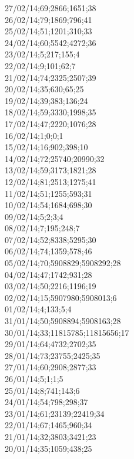 27/02/14;69;2866;1651;38 \\
26/02/14;79;1869;796;41 \\
25/02/14;51;1201;310;33 \\
24/02/14;60;5542;4272;36 \\
23/02/14;5;217;155;4 \\
22/02/14;9;101;62;7 \\
21/02/14;74;2325;2507;39 \\
20/02/14;35;630;65;25 \\
19/02/14;39;383;136;24 \\
18/02/14;59;3330;1998;35 \\
17/02/14;47;2220;1076;28 \\
16/02/14;1;0;0;1 \\
15/02/14;16;902;398;10 \\
14/02/14;72;25740;20990;32 \\
13/02/14;59;3173;1821;28 \\
12/02/14;81;2513;1275;41 \\
11/02/14;51;1255;593;31 \\
10/02/14;54;1684;698;30 \\
09/02/14;5;2;3;4 \\
08/02/14;7;195;248;7 \\
07/02/14;52;8338;5295;30 \\
06/02/14;74;1359;578;46 \\
05/02/14;70;5908829;5908292;28 \\
04/02/14;47;1742;931;28 \\
03/02/14;50;2216;1196;19 \\
02/02/14;15;5907980;5908013;6 \\
01/02/14;4;133;5;4 \\
31/01/14;50;5908894;5908163;28 \\
30/01/14;33;11815785;11815656;17 \\
29/01/14;64;4732;2702;35 \\
28/01/14;73;23755;2425;35 \\
27/01/14;60;2908;2877;33 \\
26/01/14;5;1;1;5 \\
25/01/14;8;741;143;6 \\
24/01/14;54;798;298;37 \\
23/01/14;61;23139;22419;34 \\
22/01/14;67;1465;960;34 \\
21/01/14;32;3803;3421;23 \\
20/01/14;35;1059;438;25 \\

